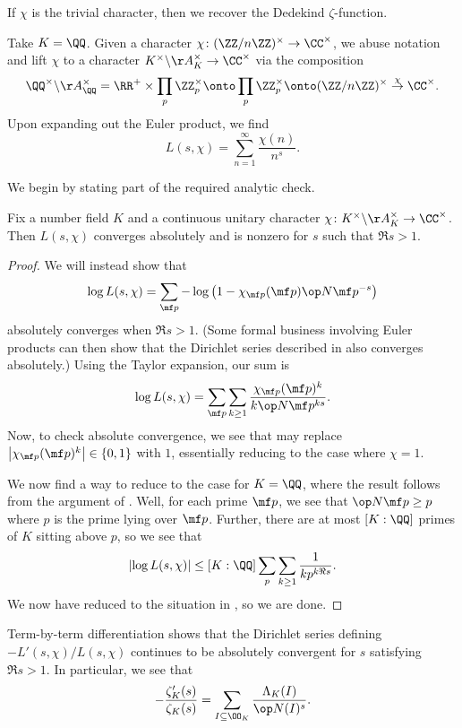 \documentclass[../thesis.tex]{subfiles}
\begin{document}
\begin{example}
	If $\chi$ is the trivial character, then we recover the Dedekind $\zeta$-function.
\end{example}
\begin{example}
	Take $K=\QQ$. Given a character $\chi\colon(\ZZ/n\ZZ)^\times\to\CC^\times$, we abuse notation and lift $\chi$ to a character $K^\times\backslash\AA_K^\times\to\CC^\times$ via the composition
	\[\QQ^\times\backslash\AA_\QQ^\times=\RR^+\times\prod_p\ZZ_p^\times\onto\prod_p\ZZ_p^\times\onto(\ZZ/n\ZZ)^\times\stackrel\chi\to\CC^\times.\]
	Upon expanding out the Euler product, we find
	\[L(s,\chi)=\sum_{n=1}^\infty\frac{\chi(n)}{n^s}.\]
\end{example}
We begin by stating part of the required analytic check.
\begin{lemma} \label{lem:hecke-abs-conv}
	Fix a number field $K$ and a continuous unitary character $\chi\colon K^\times\backslash\AA_K^\times\to\CC^\times$. Then $L(s,\chi)$ converges absolutely and is nonzero for $s$ such that $\Re s>1$.
\end{lemma}
\begin{proof}
	We will instead show that
	\[\log L(s,\chi)=\sum_{\mf p}-\log\left(1-\chi_{\mf p}(\mf p)\op N\mf p^{-s}\right)\]
	absolutely converges when $\Re s>1$. (Some formal business involving Euler products can then show that the Dirichlet series described in  also converges absolutely.) Using the Taylor expansion, our sum is
	\[\log L(s,\chi)=\sum_{\mf p}\sum_{k\ge1}\frac{\chi_{\mf p}(\mf p)^k}{k\op N\mf p^{ks}}.\]
	Now, to check absolute convergence, we see that may replace $\left|\chi_{\mf p}(\mf p)^k\right|\in\{0,1\}$ with $1$, essentially reducing to the case where $\chi=1$.

	We now find a way to reduce to the case for $K=\QQ$, where the result follows from the argument of . Well, for each prime $\mf p$, we see that $\op N\mf p\ge p$ where $p$ is the prime lying over $\mf p$. Further, there are at most $[K:\QQ]$ primes of $K$ sitting above $p$, so we see that
	\[\left|\log L(s,\chi)\right|\le[K:\QQ]\sum_{p}\sum_{k\ge1}\frac{1}{kp^{k\Re s}}.\]
	We now have reduced to the situation in , so we are done.
\end{proof}
\begin{remark} \label{rem:dlog-zeta-k}
	Term-by-term differentiation shows that the Dirichlet series defining $-L'(s,\chi)/L(s,\chi)$ continues to be absolutely convergent for $s$ satisfying $\Re s>1$. In particular, we see that
	\[-\frac{\zeta_K'(s)}{\zeta_K(s)}=\sum_{I\subseteq\OO_K}\frac{\Lambda_K(I)}{\op N(I)^s}.\]
\end{remark}
\end{document}
